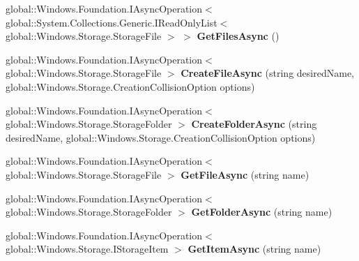 \begin{DoxyCompactItemize}
global\+::\+Windows.\+Foundation.\+I\+Async\+Operation$<$ global\+::\+System.\+Collections.\+Generic.\+I\+Read\+Only\+List$<$ global\+::\+Windows.\+Storage.\+Storage\+File $>$ $>$ {\bfseries Get\+Files\+Async} ()
\item 
\mbox{\label{interface_windows_1_1_storage_1_1_i_storage_folder_adc3079d2557ccbaaea7a22907fe80ecb}} 
global\+::\+Windows.\+Foundation.\+I\+Async\+Operation$<$ global\+::\+Windows.\+Storage.\+Storage\+File $>$ {\bfseries Create\+File\+Async} (string desired\+Name, global\+::\+Windows.\+Storage.\+Creation\+Collision\+Option options)
\item 
\mbox{\label{interface_windows_1_1_storage_1_1_i_storage_folder_a2ffb245788da50cb1ed88be933be8520}} 
global\+::\+Windows.\+Foundation.\+I\+Async\+Operation$<$ global\+::\+Windows.\+Storage.\+Storage\+Folder $>$ {\bfseries Create\+Folder\+Async} (string desired\+Name, global\+::\+Windows.\+Storage.\+Creation\+Collision\+Option options)
\item 
\mbox{\label{interface_windows_1_1_storage_1_1_i_storage_folder_aedfb6354005587caee5a943d26e729e4}} 
global\+::\+Windows.\+Foundation.\+I\+Async\+Operation$<$ global\+::\+Windows.\+Storage.\+Storage\+File $>$ {\bfseries Get\+File\+Async} (string name)
\item 
\mbox{\label{interface_windows_1_1_storage_1_1_i_storage_folder_aa0b93668a8387515b51b4e00405533bc}} 
global\+::\+Windows.\+Foundation.\+I\+Async\+Operation$<$ global\+::\+Windows.\+Storage.\+Storage\+Folder $>$ {\bfseries Get\+Folder\+Async} (string name)
\item 
\mbox{\label{interface_windows_1_1_storage_1_1_i_storage_folder_a86e9de4a9052a0961a15017f936a126c}} 
global\+::\+Windows.\+Foundation.\+I\+Async\+Operation$<$ global\+::\+Windows.\+Storage.\+I\+Storage\+Item $>$ {\bfseries Get\+Item\+Async} (string name)
\item 
\mbox{\label{interface_windows_1_1_storage_1_1_i_storage_folder_af8686cb4a5545cc0060d80dfc6c15002}} 

\end{DoxyCompactItemize}

